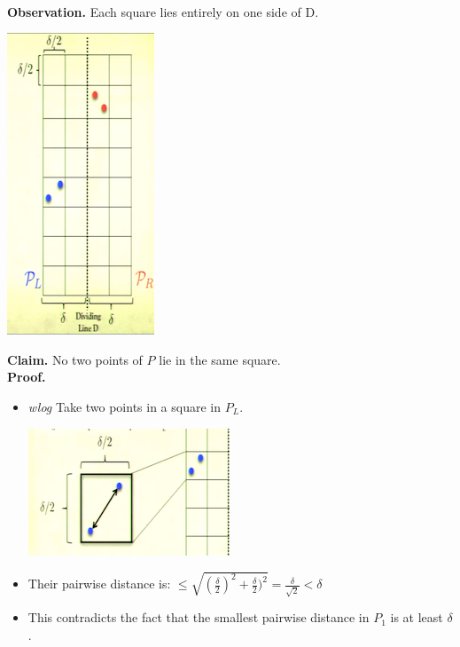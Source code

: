 \documentclass[12pt]{article}
\begin{document}
\begin{itemize}
\begin{itemize}
	\\
	\textbf{Observation.} Each square lies entirely on one side of D.
	\\
\begin{center}
	\includegraphics{lecture69}
\end{center}	
\textbf{Claim.} No two points of $P$ lie in the same square.\\
\textbf{Proof.}
		 \begin{itemize}
		\item \textit{wlog} Take two points in a square in $P_L$.
		\begin{center}
		\includegraphics{lecture610}
		\end{center}
		\item Their pairwise distance is: {\large $\leq \sqrt{(\frac{\delta}{2})^2 + \frac{\delta}{2})^2} = \frac{\delta}{\sqrt{2}} < \delta$}
		\item This contradicts the fact that the smallest pairwise distance in $P_1$ is at least $\delta$.
		\end{itemize}
	\end{itemize}
	

\end{itemize}
\end{document}
